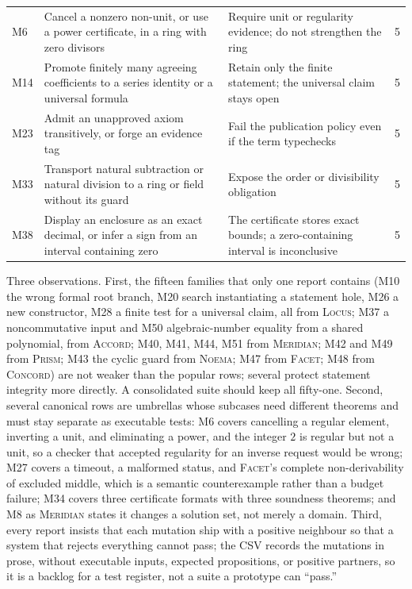 \documentclass[11pt,a4paper]{article}
\newcommand{\Lc}{\textsc{Locus}}
\newcommand{\Ac}{\textsc{Accord}}
\newcommand{\Cc}{\textsc{Concord}}
\newcommand{\Fc}{\textsc{Facet}}
\newcommand{\Md}{\textsc{Meridian}}
\newcommand{\Nm}{\textsc{Noema}}
\newcommand{\Pm}{\textsc{Prism}}
\theoremstyle{definition}
\begin{document}
\begin{table}[htbp]
\begin{tabularx}{\textwidth}{@{}L{8mm}YL{58mm}r@{}}
M6 & Cancel a nonzero non-unit, or use a power certificate, in a ring with zero divisors & Require unit or regularity evidence; do not strengthen the ring & 5\\
M14 & Promote finitely many agreeing coefficients to a series identity or a universal formula & Retain only the finite statement; the universal claim stays open & 5\\
M23 & Admit an unapproved axiom transitively, or forge an evidence tag & Fail the publication policy even if the term typechecks & 5\\
M33 & Transport natural subtraction or natural division to a ring or field without its guard & Expose the order or divisibility obligation & 5\\
M38 & Display an enclosure as an exact decimal, or infer a sign from an interval containing zero & The certificate stores exact bounds; a zero-containing interval is inconclusive & 5\\
\bottomrule
\end{tabularx}
\end{table}

Three observations. First, the fifteen families that only one report contains (M10 the wrong formal root branch, M20 search instantiating a statement hole, M26 a new constructor, M28 a finite test for a universal claim, all from \Lc; M37 a noncommutative input and M50 algebraic-number equality from a shared polynomial, from \Ac; M40, M41, M44, M51 from \Md; M42 and M49 from \Pm; M43 the cyclic guard from \Nm; M47 from \Fc; M48 from \Cc) are not weaker than the popular rows; several protect statement integrity more directly. A consolidated suite should keep all fifty-one. Second, several canonical rows are umbrellas whose subcases need different theorems and must stay separate as executable tests: M6 covers cancelling a regular element, inverting a unit, and eliminating a power, and the integer $2$ is regular but not a unit, so a checker that accepted regularity for an inverse request would be wrong; M27 covers a timeout, a malformed status, and \Fc's complete non-derivability of excluded middle, which is a semantic counterexample rather than a budget failure; M34 covers three certificate formats with three soundness theorems; and M8 as \Md{} states it changes a solution set, not merely a domain. Third, every report insists that each mutation ship with a positive neighbour so that a system that rejects everything cannot pass; the CSV records the mutations in prose, without executable inputs, expected propositions, or positive partners, so it is a backlog for a test register, not a suite a prototype can ``pass.''
\end{document}
